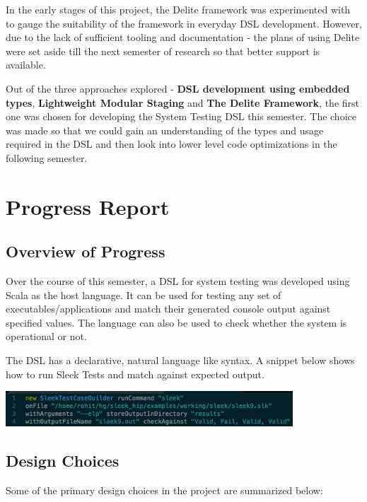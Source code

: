\documentclass[12 pt]{article}
\begin{document}
\noindent
In the early stages of this project, the Delite framework was experimented with to gauge the suitability of the framework in everyday DSL development. However, due to the lack of sufficient tooling and documentation - the plans of using Delite were set aside till the next semester of research so that better support is available.
\bigskip

\noindent
Out of the three approaches explored - \textbf{DSL development using embedded types}, \textbf{Lightweight Modular Staging} and \textbf{The Delite Framework}, the first one was chosen for developing the System Testing DSL this semester. The choice was made so that we could gain an understanding of the types and usage required in the DSL and then look into lower level code optimizations in the following semester.
\newpage
\section{Progress Report}
\subsection{Overview of Progress}
Over the course of this semester, a DSL for system testing was developed using Scala as the host language. It can be used for testing any set of executables/applications and match their generated console output against specified values. The language can also be used to check whether the system is operational or not.
\bigskip

\noindent
The DSL has a declarative, natural language like syntax. A snippet below shows how to run Sleek Tests and match against expected output.

\begin{center}
    \includegraphics[height=50px]{figures/code_snippet_1.png}
\end{center}

\subsection{Design Choices}

Some of the primary design choices in the project are summarized below:
\end{document}
